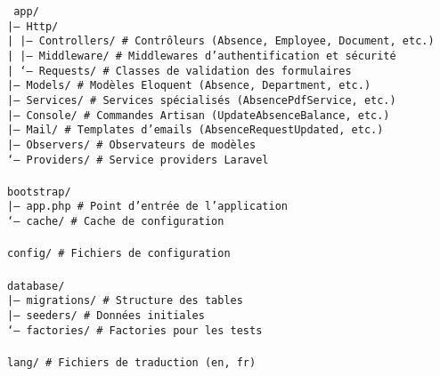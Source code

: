 \begin{tcolorbox}[colback=black!5!white, colframe=black!75!white, title=Structure du projet OptiHR, fonttitle=\bfseries]
    \texttt{
        app/ \\
        |-- Http/ \\
        |   |-- Controllers/  \quad \# Contrôleurs (Absence, Employee, Document, etc.) \\
        |   |-- Middleware/   \quad \# Middlewares d'authentification et sécurité \\
        |   `-- Requests/     \quad \# Classes de validation des formulaires \\
        |-- Models/           \quad \# Modèles Eloquent (Absence, Department, etc.) \\
        |-- Services/         \quad \# Services spécialisés (AbsencePdfService, etc.) \\
        |-- Console/          \quad \# Commandes Artisan (UpdateAbsenceBalance, etc.) \\
        |-- Mail/             \quad \# Templates d'emails (AbsenceRequestUpdated, etc.) \\
        |-- Observers/        \quad \# Observateurs de modèles \\
        `-- Providers/        \quad \# Service providers Laravel \\
        \\
        bootstrap/ \\
        |-- app.php           \quad \# Point d'entrée de l'application \\
        `-- cache/            \quad \# Cache de configuration \\
        \\
        config/               \quad \# Fichiers de configuration \\
        \\
        database/ \\
        |-- migrations/       \quad \# Structure des tables \\
        |-- seeders/          \quad \# Données initiales \\
        `-- factories/        \quad \# Factories pour les tests \\
        \\
        lang/                 \quad \# Fichiers de traduction (en, fr) \\
    }
\end{tcolorbox}

\vspace{0.5cm}

